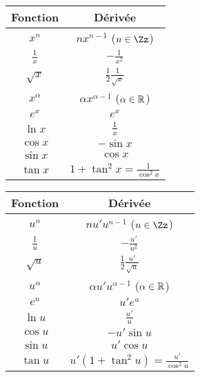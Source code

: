 \documentclass[class=report,crop=false]{standalone}
\begin{document}
\begin{center}
\setlength{\arrayrulewidth}{0.05mm}
\begin{tabular}[t]{|c|c@{\vrule depth 1.2ex height 3ex width 0mm \ }|}
\hline
\textbf{Fonction}         & \textbf{Dérivée} \\ \hline
   $x^n$         & $nx^{n-1}$  \quad ($n \in \Zz$)   \\ \hline
   $\frac 1x$    & $-\frac{1}{x^2}$              \\ \hline
   $\sqrt{x}$    & $\frac12 \frac1{\sqrt{x}}$   \\ \hline
   $x^\alpha$   & $\alpha x^{\alpha-1}$  \quad ($\alpha\in\mathbb{R}$)  \\ \hline
   $e^x$         & $e^x$                        \\ \hline
   $\ln x$       & $\frac 1x$                   \\ \hline
   $\cos x$      & $-\sin x$                    \\ \hline
   $\sin x$      & $\cos x$                     \\ \hline
   $\tan x$      & $1+\tan^2 x = \frac{1}{\cos^2 x}$        \\ \hline
\end{tabular}
\hspace*{2cm}
\begin{tabular}[t]{|c|c@{\vrule depth 1.2ex height 3ex width 0mm \ }|}
\hline
\textbf{Fonction}         & \textbf{Dérivée} \\ \hline
   $u^n$         & $nu'u^{n-1}$  \quad  ($n \in \Zz$)   \\ \hline
   $\frac 1u$    & $-\frac{u'}{u^2}$              \\ \hline
   $\sqrt{u}$    & $\frac12 \frac{u'}{\sqrt{u}}$   \\ \hline
   $u^\alpha$   & $\alpha u' u^{\alpha-1}$ \quad ($\alpha\in\mathbb{R}$)  \\ \hline
   $e^u$         & $u'e^u$                        \\ \hline
   $\ln u$       & $\frac {u'}{u}$                   \\ \hline
   $\cos u$      & $-u'\sin u$                    \\ \hline
   $\sin u$      & $u'\cos u$                     \\ \hline
   $\tan u$      & $u'(1+\tan^2 u) = \frac{u'}{\cos^2 u}$        \\ \hline
\end{tabular}
\hfill
\end{center}
\end{document}
